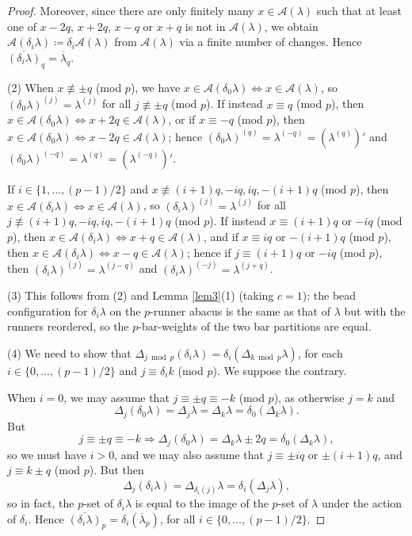 \documentclass[ALCO, Unicode,published]{cedram}
\newcommand*\nicefrac[2]{#1/#2}
\begin{document}
\begin{proof}
Moreover, since there are only finitely many $x\in\mathcal{A}(\lambda)$ such that at least one of $x-2q$, $x+2q$, $x-q$ or $x+q$ is not in $\mathcal{A}(\lambda)$, we obtain $\mathcal{A}(\delta_i\lambda)\coloneqq\delta_i\mathcal{A}(\lambda)$ from $\mathcal{A}(\lambda)$ via a finite number of changes. Hence $\overline{(\delta_i\lambda)}_q=\overline{\lambda}_q$. 

\smallskip
\noindent
(2) When $x\not\equiv\pm q$ (mod $p$), we have $x\in\mathcal{A}(\delta_0\lambda)\Leftrightarrow x\in\mathcal{A}(\lambda)$, so $(\delta_0\lambda)^{(j)}=\lambda^{(j)}$ for all $j\not\equiv\pm q$ (mod $p$). If instead $x\equiv q$ (mod $p$), then $x\in\mathcal{A}(\delta_0\lambda)\Leftrightarrow x+2q\in\mathcal{A}(\lambda)$, or if $x\equiv-q$ (mod $p$), then $x\in\mathcal{A}(\delta_0\lambda)\Leftrightarrow x-2q\in\mathcal{A}(\lambda)$; hence $(\delta_0\lambda)^{(q)}=\lambda^{(-q)}=(\lambda^{(q)})'$ and $(\delta_0\lambda)^{(-q)}=\lambda^{(q)}=(\lambda^{(-q)})'$. 

If $i\in\{1,\dots,\nicefrac{(p-1)}{2}\}$ and $x\not\equiv(i+1)q,-iq,iq,-(i+1)q$ (mod $p$), then $x\in\mathcal{A}(\delta_i\lambda)\Leftrightarrow x\in\mathcal{A}(\lambda)$, so $(\delta_i\lambda)^{(j)}=\lambda^{(j)}$ for all $j\not\equiv(i+1)q,-iq,iq,-(i+1)q$ (mod $p$). If instead $x\equiv(i+1)q$ or $-iq$ (mod $p$), then $x\in\mathcal{A}(\delta_i\lambda)\Leftrightarrow x+q\in\mathcal{A}(\lambda)$, and if $x\equiv iq$ or $-(i+1)q$ (mod $p$), then $x\in\mathcal{A}(\delta_i\lambda)\Leftrightarrow x-q\in\mathcal{A}(\lambda)$; hence if $j\equiv(i+1)q$ or $-iq$ (mod $p$), then $(\delta_i\lambda)^{(j)}=\lambda^{(j-q)}$ and $(\delta_i\lambda)^{(-j)}=\lambda^{(j+q)}$. 

\smallskip
\noindent
(3) This follows from (2) and Lemma \ref{lem3}(1) (taking $c=1$): the bead configuration for $\delta_i\lambda$ on the $p$-runner abacus is the same as that of $\lambda$ but with the runners reordered, so the $p$-bar-weights of the two bar partitions are equal. 

\smallskip
\noindent
(4) We need to show that $\Delta_{j\bmod p}(\delta_i\lambda)=\delta_i(\Delta_{k\bmod p}\lambda)$, for each $i\in\{0,\dots,\nicefrac{(p-1)}{2}\}$ and $j\equiv\delta_ik$ (mod $p$). We suppose the contrary. 

When $i=0$, we may assume that $j\equiv\pm q\equiv-k$ (mod $p$), as otherwise $j=k$ and 
$$\Delta_j(\delta_0\lambda)=\Delta_j\lambda=\Delta_k\lambda=\delta_0(\Delta_k\lambda).$$ 
But $$j\equiv\pm q\equiv-k\Rightarrow\Delta_j(\delta_0\lambda)=\Delta_k\lambda\pm2q=\delta_0(\Delta_k\lambda),$$ 
so we must have $i>0$, and we may also assume that $j\equiv\pm iq$ or $\pm(i+1)q$, and $j\equiv k\pm q$ (mod $p$). But then 
$$\Delta_j(\delta_i\lambda)=\Delta_{\delta_i(j)}\lambda=\delta_i(\Delta_j\lambda),$$ 
so in fact, the $p$-set of $\delta_i\lambda$ is equal to the image of the $p$-set of $\lambda$ under the action of $\delta_i$. Hence $\overline{(\delta_i\lambda)}_p=\delta_i(\overline{\lambda}_p)$, for all $i\in\{0,\dots,\nicefrac{(p-1)}{2}\}$. 
\end{proof}
\end{document}
